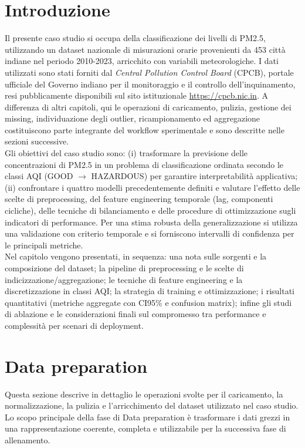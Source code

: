 \documentclass[a4paper,12pt]{report}
\begin{document}
	\section{Introduzione}
	Il presente caso studio si occupa della classificazione dei livelli di PM2.5, utilizzando un dataset nazionale di misurazioni orarie provenienti da 453 città indiane nel periodo 2010-2023, arricchito con variabili meteorologiche. I dati utilizzati sono stati forniti dal \textit{Central Pollution Control Board} (CPCB), portale ufficiale del Governo indiano per il monitoraggio e il controllo dell’inquinamento, resi pubblicamente disponibili sul sito istituzionale \url{https://cpcb.nic.in}. A differenza di altri capitoli, qui le operazioni di caricamento, pulizia, gestione dei missing, individuazione degli outlier, ricampionamento ed aggregazione costituiscono parte integrante del workflow sperimentale e sono descritte nelle sezioni successive. \\
	Gli obiettivi del caso studio sono: (i) trasformare la previsione delle concentrazioni di PM2.5 in un problema di classificazione ordinata secondo le classi AQI (GOOD $\rightarrow$ HAZARDOUS) per garantire interpretabilità applicativa; (ii) confrontare i quattro modelli precedentemente definiti e valutare l’effetto delle scelte di preprocessing, del feature engineering temporale (lag, componenti cicliche), delle tecniche di bilanciamento e delle procedure di ottimizzazione sugli indicatori di performance. Per una stima robusta della generalizzazione si utilizza una validazione con criterio temporale e si forniscono intervalli di confidenza per le principali metriche. \\
	Nel capitolo vengono presentati, in sequenza: una nota sulle sorgenti e la composizione del dataset; la pipeline di preprocessing e le scelte di indicizzazione/aggregazione; le tecniche di feature engineering e la discretizzazione in classi AQI; la strategia di training e ottimizzazione; i risultati quantitativi (metriche aggregate con CI95\% e confusion matrix); infine gli studi di ablazione e le considerazioni finali sul compromesso tra performance e complessità per scenari di deployment.
	
	\section{Data preparation}
	
	Questa sezione descrive in dettaglio le operazioni svolte per il caricamento, la normalizzazione, la pulizia e l'arricchimento del dataset utilizzato nel caso studio. Lo scopo principale della fase di Data preparation è trasformare i dati grezzi in una rappresentazione coerente, completa e utilizzabile per la successiva fase di allenamento.
	
\end{document}
